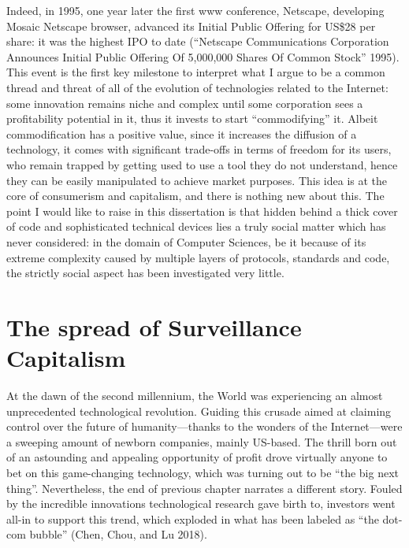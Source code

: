 \documentclass[
  a4paper,
]{book}
\begin{document}
Indeed, in 1995, one year later the first www conference, Netscape, developing Mosaic Netscape browser, advanced its Initial Public Offering for US\$28 per share: it was the highest IPO to date {({``Netscape {Communications Corporation Announces Initial Public Offering Of} 5,000,000 {Shares Of Common Stock}''} 1995)}. This event is the first key milestone to interpret what I argue to be a common thread and threat of all of the evolution of technologies related to the Internet: some innovation remains niche and complex until some corporation sees a profitability potential in it, thus it invests to start ``commodifying'' it. Albeit commodification has a positive value, since it increases the diffusion of a technology, it comes with significant trade-offs in terms of freedom for its users, who remain trapped by getting used to use a tool they do not understand, hence they can be easily manipulated to achieve market purposes. This idea is at the core of consumerism and capitalism, and there is nothing new about this. The point I would like to raise in this dissertation is that hidden behind a thick cover of code and sophisticated technical devices lies a truly social matter which has never considered: in the domain of Computer Sciences, be it because of its extreme complexity caused by multiple layers of protocols, standards and code, the strictly social aspect has been investigated very little.

\hypertarget{the-spread-of-surveillance-capitalism}{%
\chapter{The spread of Surveillance Capitalism}\label{the-spread-of-surveillance-capitalism}}

At the dawn of the second millennium, the World was experiencing an almost unprecedented technological revolution. Guiding this crusade aimed at claiming control over the future of humanity---thanks to the wonders of the Internet---were a sweeping amount of newborn companies, mainly US-based. The thrill born out of an astounding and appealing opportunity of profit drove virtually anyone to bet on this game-changing technology, which was turning out to be ``the big next thing''. Nevertheless, the end of previous chapter narrates a different story. Fouled by the incredible innovations technological research gave birth to, investors went all-in to support this trend, which exploded in what has been labeled as ``the dot-com bubble'' {(Chen, Chou, and Lu 2018)}.
\end{document}
